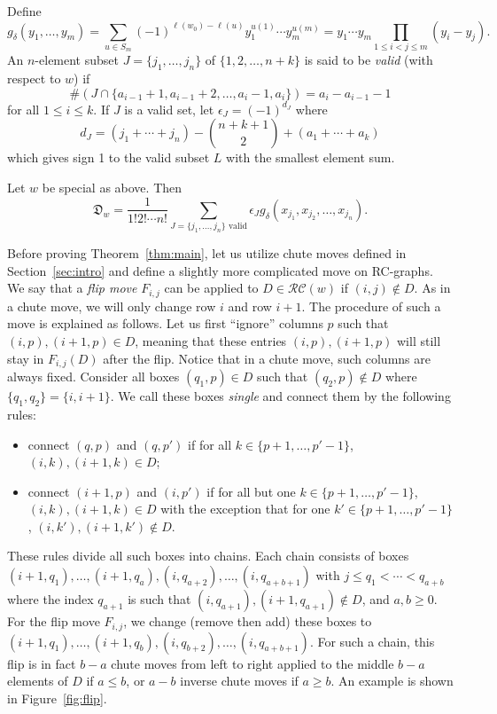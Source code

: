 \documentclass[ALCO,ThmDefs,Unicode,epreuves]{cedram}
\newcommand{\D}{\mathfrak{D}}
\newcommand{\RC}{\mathcal{RC}}
\begin{document}
Define
\[
g_{\delta}(y_1,\ldots,y_m)=\sum_{u\in S_m}(-1)^{\ell(w_0)-\ell(u)}y_1^{u(1)}\cdots y_m^{u(m)}=y_1\cdots y_m\prod_{1\leq i<j\leq m}(y_i-y_j).
\]
An $n$-element subset $J=\{j_1,\ldots,j_n\}$ of $\{1,2,\ldots,n+k\}$ is said to be \emph{valid} (with respect to $w$) if
\[
\#(J\cap\{a_{i-1}+1,a_{i-1}+2,\ldots,a_i-1,a_i\})=a_i-a_{i-1}-1
\]
for all $1\leq i\leq k$. If $J$ is a valid set, let $\epsilon_J=(-1)^{d_J}$ where
\[
d_J=(j_1+\cdots+j_n)-\binom{n+k+1}{2}+(a_1+\cdots+a_k)
\]
which gives sign 1 to the valid subset $L$ with the smallest element sum.
\begin{theorem}\label{thm:main}
Let $w$ be special as above. Then
\[
\D_w=\frac{1}{1!2!\cdots n!}\sum_{J=\{j_1,\ldots,j_n\}\text{ valid}}\epsilon_J g_{\delta}(x_{j_1},x_{j_2},\ldots,x_{j_n}).
\]
\end{theorem}
Before proving Theorem~\ref{thm:main}, let us utilize chute moves defined in Section~\ref{sec:intro} and define a slightly more complicated move on RC-graphs. We say that a \emph{flip move} $F_{i,j}$ can be applied to $D\in\RC(w)$ if $(i,j)\notin D$. As in a chute move, we will only change row $i$ and row $i+1$. The procedure of such a move is explained as follows. Let us first ``ignore'' columns $p$ such that $(i,p),(i+1,p)\in D$, meaning that these entries $(i,p),(i+1,p)$ will still stay in $F_{i,j}(D)$ after the flip. Notice that in a chute move, such columns are always fixed. Consider all boxes $(q_1,p)\in D$ such that $(q_2,p)\notin D$ where $\{q_1,q_2\}=\{i,i+1\}$. We call these boxes \emph{single} and connect them by the following rules:
\begin{itemize}
\item connect $(q,p)$ and $(q,p')$ if for all $k\in \{p+1,\ldots,p'-1\}$, $(i,k),(i+1,k)\in D$;
\item connect $(i+1,p)$ and $(i,p')$ if for all but one $k\in\{p+1,\ldots,p'-1\}$, $(i,k),(i+1,k)\in D$ with the exception that for one $k'\in \{p+1,\ldots,p'-1\}$, $(i,k'),(i+1,k')\notin D$.
\end{itemize}
These rules divide all such boxes into chains. Each chain consists of boxes $(i+1,q_1),\ldots,(i+1,q_a),(i,q_{a+2}),\ldots,(i,q_{a+b+1})$ with $j\leq q_1<\cdots<q_{a+b}$ where the index $q_{a+1}$ is such that $(i,q_{a+1}),(i+1,q_{a+1})\notin D$, and $a,b\geq0$. For the flip move $F_{i,j}$, we change (remove then add) these boxes to $(i+1,q_1),\ldots,(i+1,q_b),(i,q_{b+2}),\ldots,(i,q_{a+b+1}).$ For such a chain, this flip is in fact $b-a$ chute moves from left to right applied to the middle $b-a$ elements of $D$ if $a\leq b$, or $a-b$ inverse chute moves if $a\geq b$. An example is shown in Figure~\ref{fig:flip}.
\end{document}
